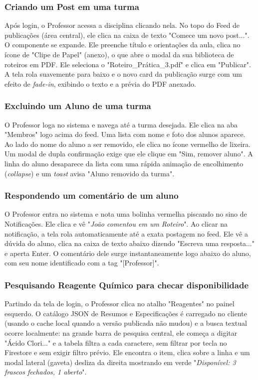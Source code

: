 \subsubsection{Criando um Post em uma turma}
Após login, o Professor acessa a disciplina clicando nela. No topo do Feed de publicações (área central), ele clica na caixa de texto "Comece um novo post...". O componente se expande. Ele preenche título e orientações da aula, clica no ícone de "Clipe de Papel" (anexo), o que abre o modal da sua biblioteca de roteiros em PDF. Ele seleciona o "Roteiro\_Prática\_3.pdf" e clica em "Publicar". A tela rola suavemente para baixo e o novo card da publicação surge com um efeito de \textit{fade-in}, exibindo o texto e a prévia do PDF anexado.

\subsubsection{Excluindo um Aluno de uma turma}
O Professor loga no sistema e navega até a turma desejada. Ele clica na aba "Membros" logo acima do feed. Uma lista com nome e foto dos alunos aparece. Ao lado do nome do aluno a ser removido, ele clica no ícone vermelho de lixeira. Um modal de dupla confirmação exige que ele clique em "Sim, remover aluno". A linha do aluno desaparece da lista com uma rápida animação de encolhimento (\textit{collapse}) e um \textit{toast} avisa "Aluno removido da turma".

\subsubsection{Respondendo um comentário de um aluno}
O Professor entra no sistema e nota uma bolinha vermelha piscando no sino de Notificações. Ele clica e vê "\textit{João comentou em um Roteiro}". Ao clicar na notificação, a tela rola automaticamente até a exata postagem no feed. Ele vê a dúvida do aluno, clica na caixa de texto abaixo dizendo "Escreva uma resposta..." e aperta Enter. O comentário dele surge instantaneamente logo abaixo do aluno, com seu nome identificado com a tag "[Professor]".

\subsubsection{Pesquisando Reagente Químico para checar disponibilidade}
Partindo da tela de login, o Professor clica no atalho "Reagentes" no painel esquerdo. O catálogo JSON de Resumos e Especificações é carregado no cliente (usando o cache local quando a versão publicada não mudou) e a busca textual ocorre localmente: na grande barra de pesquisa central, ele começa a digitar "Ácido Clori..." e a tabela filtra a cada caractere, sem filtrar por tecla no Firestore e sem exigir filtro prévio. Ele encontra o item, clica sobre a linha e um modal lateral (gaveta) desliza da direita mostrando em verde "\textit{Disponível: 3 frascos fechados, 1 aberto}".

